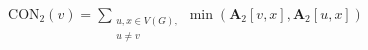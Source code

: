 \documentclass[preview]{standalone}
\begin{document}
\begin{align*}
\text{CON}_{2}(v) = \sum_{\substack{u, x \in V(G), \\ u \neq v}} \min(\mathbf{A}_{2}[v, x], \mathbf{A}_{2}[u, x])
\end{align*}
\end{document}
